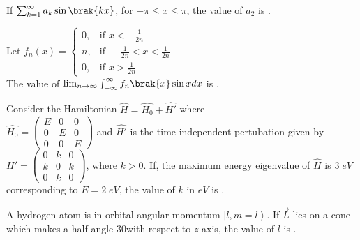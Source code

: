 \item If $\sum_{k=1}^{\infty}a_k\sin\brak{kx}$, for $-\pi \leq x \leq\pi$, the value of $a_2$ is \underline{\hspace{2cm}}.
\item Let $f_n(x) = 
\begin{cases} 
    0, & \text{if } x < -\frac{1}{2n} \\ 
    n, & \text{if } -\frac{1}{2n} < x < \frac{1}{2n} \\ 
    0, & \text{if } x > \frac{1}{2n} 
\end{cases}$\\ The value of $\lim_{n\to \infty}\int_{-\infty}^{\infty}f_n\brak{x}\sin xdx$ is \underline{\hspace{2cm}}.

\item Consider the Hamiltonian $\hat{H}=\hat{H_0}+\hat{H'}$ where\\
$\hat{H_0}=
\begin{pmatrix}
    E & 0 & 0\\
    0 & E & 0\\
    0 & 0 & E
\end{pmatrix}$ and $\hat{H'}$ is the time independent pertubation given by \\
$\hat{H'}=\begin{pmatrix}
    0 & k & 0\\
    k & 0 & k\\
    0 & k & 0
\end{pmatrix}$, where $k>0$. If, the maximum energy eigenvalue of $\hat{H}$ is $3\;eV$ corresponding to $E=2\;eV$, the value of $k$  in $eV$ is \underline{\hspace{2cm}}.
\item A hydrogen atom is in orbital angular momentum $\left | l,m=l\right\rangle$. If $\overrightarrow{L}$ lies on a cone which makes a half angle 30\degree with respect to $z$-axis, the value of $l$ is \underline{\hspace{2cm}}.

